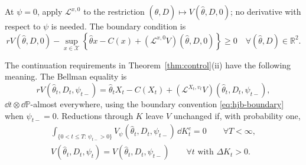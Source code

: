 \documentclass[12pt]{article}
\newcommand{\hth}{\hat\theta}
\begin{document}
At \(\psi=0\), apply \(\mathcal L^{x,0}\) to the restriction
\((\hth,D)\mapsto V(\hth,D,0)\); no derivative with respect to
\(\psi\) is needed. The boundary condition is
\begin{equation}\label{eq:hjb-boundary}
  rV(\hth,D,0)
  -\sup_{x\in\mathcal X}
  \left\{
    \hth x-C(x)+(\mathcal L^{x,0}V)(\hth,D,0)
  \right\}
  \geq0
  \quad\forall(\hth,D)\in\mathbb R^2.
\end{equation}

The continuation requirements in
Theorem~\ref{thm:control}\textnormal{(ii)} have the following meaning.
The Bellman equality is
\begin{equation}\label{eq:verification-bellman}
  rV(\hth_t,D_t,\psi_{t-})
  =
  \hth_tX_t-C(X_t)
  +(\mathcal L^{X_t,v_t}V)(\hth_t,D_t,\psi_{t-}),
\end{equation}
\(\dd t\otimes\dd\mathbb P\)-almost everywhere, using the
boundary convention \eqref{eq:hjb-boundary} when \(\psi_{t-}=0\).
Reductions through \(K\) leave \(V\) unchanged if, with probability one,
\begin{equation}\label{eq:verification-adjustment}
\begin{gathered}
  \int_{\{0<t\leq T:\,\psi_{t-}>0\}}
  V_\psi(\hth_t,D_t,\psi_{t-})\,\dd K_t^c=0
  \qquad\forall T<\infty,\\
  V(\hth_t,D_t,\psi_t)
  =
  V(\hth_t,D_t,\psi_{t-})
  \qquad\forall t\text{ with }\Delta K_t>0.
\end{gathered}
\end{equation}
\end{document}
